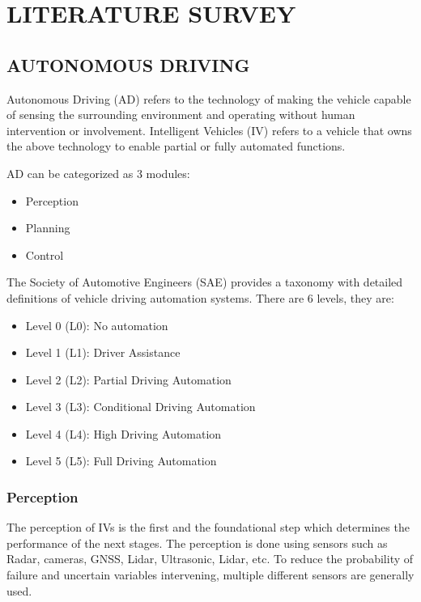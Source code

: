 
\chapter{\uppercase{Literature Survey}} %
\label{ch:survey} %

\begin{spacing}{1.5} 
\begin{sloppypar}
\section{AUTONOMOUS DRIVING}
Autonomous Driving (AD) refers to the technology of making the vehicle capable of sensing the surrounding environment and operating without human intervention or involvement. Intelligent Vehicles (IV) refers to a vehicle that owns the above technology to enable partial or fully automated functions. \cite{chen2023milestones}

AD can be categorized as 3 modules:
\begin{itemize}
    \item Perception
    \item Planning
    \item Control
\end{itemize}

The Society of Automotive Engineers (SAE) provides a taxonomy with detailed definitions of vehicle driving automation systems. There are 6 levels, they are:
\begin{itemize}
    \item Level 0 (L0): No automation
    \item Level 1 (L1): Driver Assistance
    \item Level 2 (L2): Partial Driving Automation
    \item Level 3 (L3): Conditional Driving Automation
    \item Level 4 (L4): High Driving Automation
    \item Level 5 (L5): Full Driving Automation
\end{itemize}
\subsection{Perception}
The perception of IVs is the first and the foundational step which determines the performance of the next stages. The perception is done using sensors such as Radar, cameras, GNSS, Lidar, Ultrasonic, Lidar, etc. To reduce the probability of failure and uncertain variables intervening, multiple different sensors are generally used. 


\end{sloppypar}
\end{spacing}
